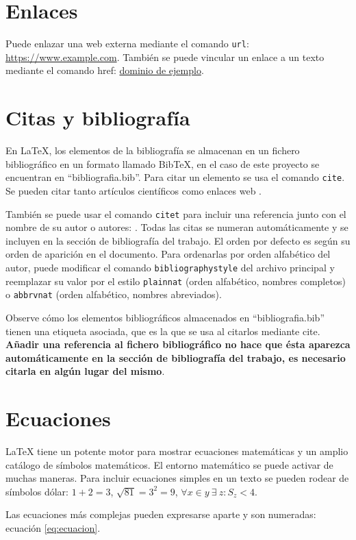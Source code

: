 \section{Enlaces}
Puede enlazar una web externa mediante el comando \texttt{url}: \url{https://www.example.com}. También se puede vincular un enlace a un texto mediante el comando href: \href{https://www.example.com}{dominio de ejemplo}.

\section{Citas y bibliografía}
En LaTeX, los elementos de la bibliografía se almacenan en un fichero bibliográfico en un formato llamado BibTeX, en el caso de este proyecto se encuentran en ``bibliografia.bib''. Para citar un elemento se usa el comando \texttt{cite}. Se pueden citar tanto artículos científicos \cite{borrego2019} como enlaces web \cite{webETSII}. 

También se puede usar el comando \texttt{citet} para incluir una referencia junto con el nombre de su autor o autores: \citet{borrego2021}. Todas las citas se numeran automáticamente y se incluyen en la sección de bibliografía del trabajo. El orden por defecto es según su orden de aparición en el documento. Para ordenarlas por orden alfabético del autor, puede modificar el comando \texttt{bibliographystyle} del archivo principal y reemplazar su valor por el estilo \texttt{plainnat} (orden alfabético, nombres completos) o \texttt{abbrvnat} (orden alfabético, nombres abreviados).

Observe cómo los elementos bibliográficos almacenados en ``bibliografia.bib'' tienen una etiqueta asociada, que es la que se usa al citarlos mediante cite. \textbf{Añadir una referencia al fichero bibliográfico no hace que ésta aparezca automáticamente en la sección de bibliografía del trabajo, es necesario citarla en algún lugar del mismo}.

\section{Ecuaciones}
LaTeX tiene un potente motor para mostrar ecuaciones matemáticas y un amplio catálogo de símbolos matemáticos. El entorno matemático se puede activar de muchas maneras. Para incluir ecuaciones simples en un texto se pueden rodear de símbolos dólar: $1 + 2 = 3$, $\sqrt{81} = 3^2 = 9$, $\forall x \in y~\exists~z : S_z < 4$.

Las ecuaciones más complejas pueden expresarse aparte y son numeradas: ecuación \ref{eq:ecuacion}.

